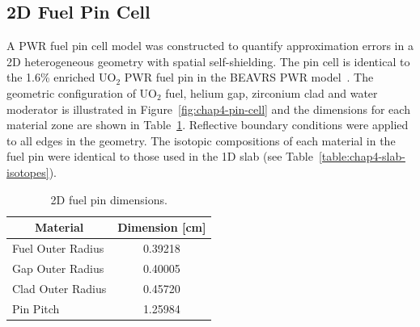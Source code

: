 \subsection{2D Fuel Pin Cell}
\label{subsec:chap4-pin}

A \ac{PWR} fuel pin cell model was constructed to quantify approximation errors in a 2D heterogeneous geometry with spatial self-shielding. The pin cell is identical to the 1.6\% enriched UO$_2$ \ac{PWR} fuel pin in the \ac{BEAVRS} \ac{PWR} model~\cite{horelik2013beavrs}. The geometric configuration of UO$_2$ fuel, helium gap, zirconium clad and water moderator is illustrated in Figure~\ref{fig:chap4-pin-cell} and the dimensions for each material zone are shown in Table~\ref{table:chap4-pin-dimensions}. Reflective boundary conditions were applied to all edges in the geometry. The isotopic compositions of each material in the fuel pin were identical to those used in the 1D slab (see Table~\ref{table:chap4-slab-isotopes}). 

\begin{table}[H]
  \centering
  \caption{2D fuel pin dimensions.}
  \label{table:chap4-pin-dimensions} 
  \vspace{6pt}
  \begin{tabular}{l c}
  \toprule
  \multicolumn{1}{c}{\bf Material} &
  \multicolumn{1}{c}{\bf Dimension [cm]} \\
  \midrule
  Fuel Outer Radius &     0.39218 \\
  Gap Outer Radius &      0.40005 \\
  Clad Outer Radius &     0.45720 \\
  Pin Pitch &             1.25984 \\
  \bottomrule
\end{tabular}
\end{table}

